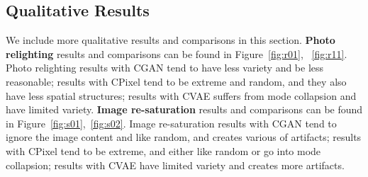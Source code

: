 \documentclass[10pt,twocolumn,letterpaper]{article}
\begin{document}
\begin{table*}
\vspace{2mm}
\caption{Image re-saturation results. First part is best error to ground truth with different sample numbers; second part is variance, which 
is stable with different sample numbers. (all results need $\times 10^{-2}$)}
\label{tb:saturation}
\end{table*}

\subsection{Qualitative Results}
We include more qualitative results and comparisons in this section. \textbf{Photo relighting} results and comparisons can be found in Figure~\ref{fig:r01},
~\ref{fig:r11}. Photo relighting results with CGAN tend to have less variety and be less reasonable;
results with CPixel tend to be extreme and random, and they also have less spatial structures; results with CVAE suffers from mode collapsion and have limited variety.
\textbf{Image re-saturation} results and comparisons can be found in Figure~\ref{fig:s01},~\ref{fig:s02}. 
Image re-saturation results with CGAN tend to ignore the image content and like random,
and creates various of artifacts; results with CPixel tend to be extreme, and either like random or go into mode collapsion; results with CVAE have limited variety and creates
more artifacts. 
\end{document}

